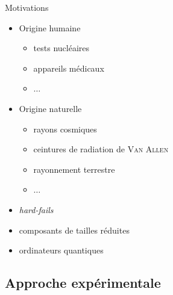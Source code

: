 \documentclass[french,bookmarks,aspectratio=43]{beamer}
\begin{document}
\begin{frame}{Motivations}
    \begin{itemize}
        \item Origine humaine\pause
        \begin{itemize}
            \item tests nucléaires\pause

            \item appareils médicaux

            \item $\dots$
        \end{itemize}

        \item Origine naturelle\pause

        \begin{itemize}
            \item rayons cosmiques\pause

            \item ceintures de radiation de \textsc{Van Allen}\pause

            \item rayonnement terrestre

            \item $\dots$
        \end{itemize}

        \item \emph{hard-fails}\pause

        \item composants de tailles réduites\pause

        \item ordinateurs quantiques
    \end{itemize}
        
\end{frame}

\subsection{Approche expérimentale}
\end{document}
